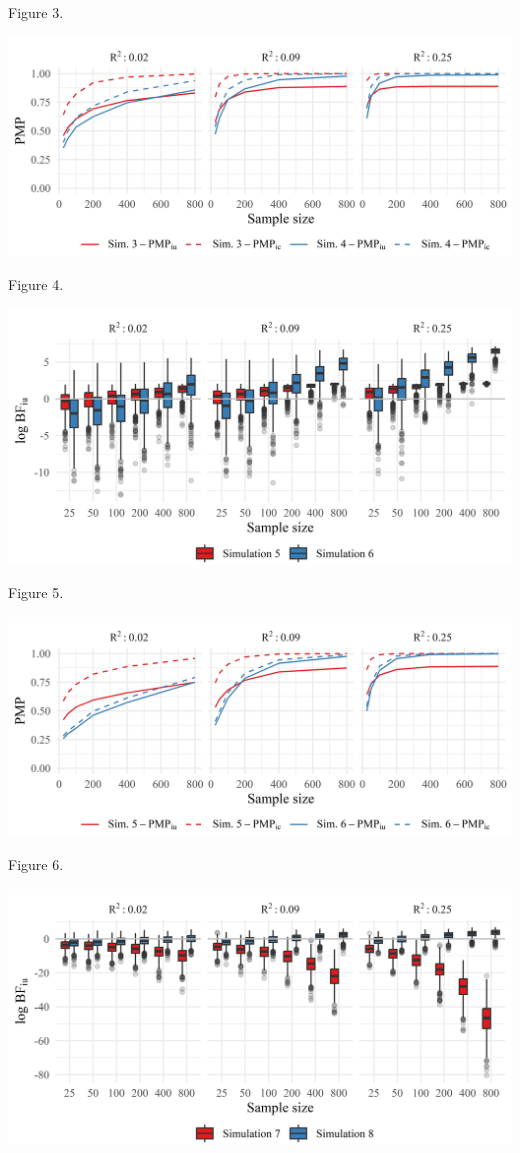 \documentclass[
]{interact}
\begin{document}
Figure 3.

\includegraphics[width=1\textwidth,height=\textheight]{figures/figure-4.jpeg}

Figure 4.

\includegraphics[width=1\textwidth,height=\textheight]{figures/figure-5.jpeg}

Figure 5.

\includegraphics[width=1\textwidth,height=\textheight]{figures/figure-6.jpeg}

Figure 6.

\includegraphics[width=1\textwidth,height=\textheight]{figures/figure-7.jpeg}
\end{document}
